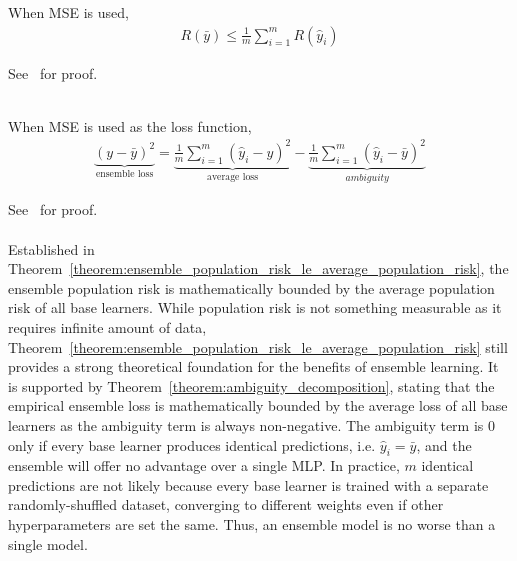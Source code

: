\begin{theorem}\label{theorem:ensemble_population_risk_le_average_population_risk}
    When MSE is used, 
    \begin{align*}
        R(\bar{y}) \le \frac{1}{m} \sum_{i=1}^{m} R(\hat{y}_i)
    \end{align*}
\end{theorem}
See~\cite{krogh1994neural} for proof. 
\\
\\
\begin{theorem}\label{theorem:ambiguity_decomposition}
    When MSE is used as the loss function, 
    \begin{align*}
        \underbrace{(y - \bar{y})^2}_{\text{ensemble loss}} = \underbrace{\frac{1}{m} \sum_{i=1}^{m} (\hat{y}_i - y)^2}_{\text{average loss}} - \underbrace{\frac{1}{m} \sum_{i=1}^{m} (\hat{y}_i - \bar{y})^2}_{ambiguity}
    \end{align*}
\end{theorem}
See~\cite{krogh1994neural} for proof. 
\\
\\
Established in Theorem~\ref{theorem:ensemble_population_risk_le_average_population_risk}, the ensemble population risk is mathematically bounded by the average population risk of all base learners. While population risk is not something measurable as it requires infinite amount of data, Theorem~\ref{theorem:ensemble_population_risk_le_average_population_risk} still provides a strong theoretical foundation for the benefits of ensemble learning. It is supported by Theorem~\ref{theorem:ambiguity_decomposition}, stating that the empirical ensemble loss is mathematically bounded by the average loss of all base learners as the ambiguity term is always non-negative. The ambiguity term is $0$ only if every base learner produces identical predictions, i.e. $\hat{y}_i = \bar{y}$, and the ensemble will offer no advantage over a single MLP. In practice, $m$ identical predictions are not likely because every base learner is trained with a separate randomly-shuffled dataset, converging to different weights even if other hyperparameters are set the same. Thus, an ensemble model is no worse than a single model. 


